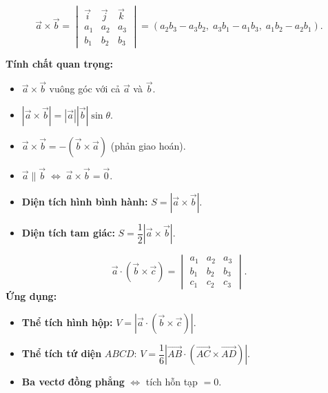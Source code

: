 \documentclass[12pt,a4paper]{article}
\begin{document}
\begin{congthuc}[title={Tích có hướng (Cross Product)}]
  \[
    \vec{a} \times \vec{b} = \begin{vmatrix}\vec{i} & \vec{j} & \vec{k} \\ a_1 & a_2 & a_3 \\ b_1 & b_2 & b_3\end{vmatrix} = (a_2 b_3 - a_3 b_2,\; a_3 b_1 - a_1 b_3,\; a_1 b_2 - a_2 b_1).
  \]

  \textbf{Tính chất quan trọng:}
  \begin{itemize}
    \item $\vec{a} \times \vec{b}$ vuông góc với cả $\vec{a}$ và $\vec{b}$.
    \item $|\vec{a} \times \vec{b}| = |\vec{a}||\vec{b}|\sin\theta$.
    \item $\vec{a} \times \vec{b} = -(\vec{b} \times \vec{a})$ (phản giao hoán).
    \item $\vec{a} \parallel \vec{b} \;\Leftrightarrow\; \vec{a} \times \vec{b} = \vec{0}$.
    \item \textbf{Diện tích hình bình hành:} $S = |\vec{a} \times \vec{b}|$.
    \item \textbf{Diện tích tam giác:} $S = \dfrac{1}{2}|\vec{a} \times \vec{b}|$.
  \end{itemize}
\end{congthuc}

\begin{congthuc}[title={Tích hỗn tạp (Scalar Triple Product)}]
  \[
    \vec{a} \cdot (\vec{b} \times \vec{c}) = \begin{vmatrix}a_1 & a_2 & a_3 \\ b_1 & b_2 & b_3 \\ c_1 & c_2 & c_3\end{vmatrix}.
  \]
  \textbf{Ứng dụng:}
  \begin{itemize}
    \item \textbf{Thể tích hình hộp:} $V = |\vec{a} \cdot (\vec{b} \times \vec{c})|$.
    \item \textbf{Thể tích tứ diện} $ABCD$: $V = \dfrac{1}{6}|\overrightarrow{AB} \cdot (\overrightarrow{AC} \times \overrightarrow{AD})|$.
    \item \textbf{Ba vectơ đồng phẳng} $\Leftrightarrow$ tích hỗn tạp $= 0$.
  \end{itemize}
\end{congthuc}
\end{document}
